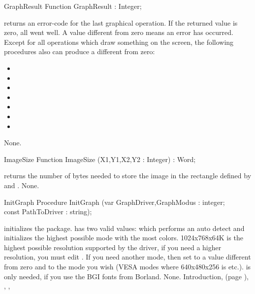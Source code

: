 \begin{function}{GraphResult}
\Declaration
Function GraphResult  : Integer;

\Description
{} returns an error-code for
the last graphical operation. If the returned value is zero, all went well.
A value different from zero means an error has occurred.
Except for all operations which draw something on the screen, 
the following procedures also can produce a  different from
zero:
\begin{itemize}
\item {}
\item {}
\item {}
\item {}
\item {}
\item {}
\item {}
\end{itemize}

\Errors
None.
\SeeAlso
{}
\end{function}
\begin{function}{ImageSize}
\Declaration
Function ImageSize (X1,Y1,X2,Y2 : Integer) : Word;

\Description
{} returns
the number of bytes needed to store the image in the rectangle defined by
 and .
\Errors
None.
\SeeAlso
{}
\end{function}
\begin{procedure}{InitGraph}
\Declaration
Procedure InitGraph (var GraphDriver,GraphModus : integer;\\
const PathToDriver : string);

\Description

 initializes the  package.
 has two valid values:  which
performs an auto detect and initializes the highest possible mode with the most
colors. 1024x768x64K is the highest possible resolution supported by the
driver, if you need a higher resolution, you must edit . 
If you need another mode, then set  to a value different
from zero
and  to the mode you wish (VESA modes where 640x480x256
is  etc.).
 is only needed, if you use the BGI fonts from
Borland.
\Errors
None.
\SeeAlso
Introduction, (page \pageref{se:Introduction}),
, , 
\end{procedure}

